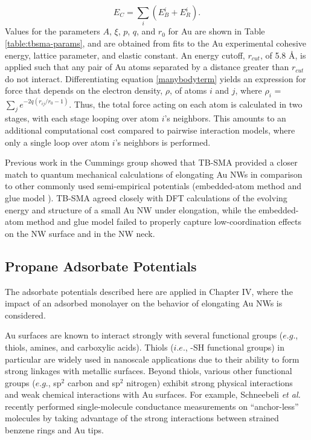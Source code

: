 \documentclass[10pt]{report}  %
\newcommand\findent{\hspace*{\parindent}}
\begin{document}
\begin{equation}E_{C}=\sum_{i}(E_{B}^{i}+E_{R}^{i}).\label{totalenergy}
\end{equation} Values for the parameters $A$, $\xi$, $p$, $q$, and $r_{0}$ for Au are shown in Table \ref{table:tbsma-params}, and are obtained from fits to the Au experimental cohesive energy, lattice parameter, and elastic constant.\cite{Cleri:1993} An energy cutoff, $r_{cut}$, of 5.8 \AA, is applied such that any pair of Au atoms separated by a distance greater than $r_{cut}$ do not interact. Differentiating equation \ref{manybodyterm} yields an expression for force that depends on the electron density, $\rho$, of atoms $i$ and $j$, where $\rho_{i}$ = $\sum_{j}e^{-2q(r_{ij}/r_{0}-1)}$. Thus, the total force acting on each atom is calculated in two stages, with each stage looping over atom $i$'s neighbors. This amounts to an additional computational cost compared to pairwise interaction models, where only a single loop over atom $i$'s neighbors is performed. 

Previous work in the Cummings group \cite{Pu_JCP:2007} showed that TB-SMA provided a closer match to quantum mechanical calculations of elongating Au NWs in comparison to other commonly used semi-empirical potentials (embedded-atom method \cite{Daw:1984} and glue model \cite{Ercolessi:1988}). TB-SMA agreed closely with DFT calculations of the evolving energy and structure of a small Au NW under elongation, while the embedded-atom method and glue model failed to properly capture low-coordination effects on the NW surface and in the NW neck. 

\subsection{Propane Adsorbate Potentials}

\findent The adsorbate potentials described here are applied in Chapter IV, where the impact of an adsorbed monolayer on the behavior of elongating Au NWs is considered. 

Au surfaces are known to interact strongly with several functional groups ($e.g.$, thiols, amines, and carboxylic acids). \cite{Chen:2006} Thiols ($i.e.$, -SH functional groups) in particular are widely used in nanoscale applications due to their ability to form strong linkages with metallic surfaces.\cite{Pontes:2006}  Beyond thiols, various other functional groups ($e.g.$, sp$^2$ carbon and sp$^2$ nitrogen) \cite{Bilic:2006,Cafe:2007} exhibit strong physical interactions and weak chemical interactions with Au surfaces.  For example, Schneebeli \emph{et al.} \cite{Schneebeli:2011} recently performed single-molecule conductance measurements on ``anchor-less'' molecules by taking advantage of the strong interactions between strained benzene rings and Au tips.     
\end{document}
